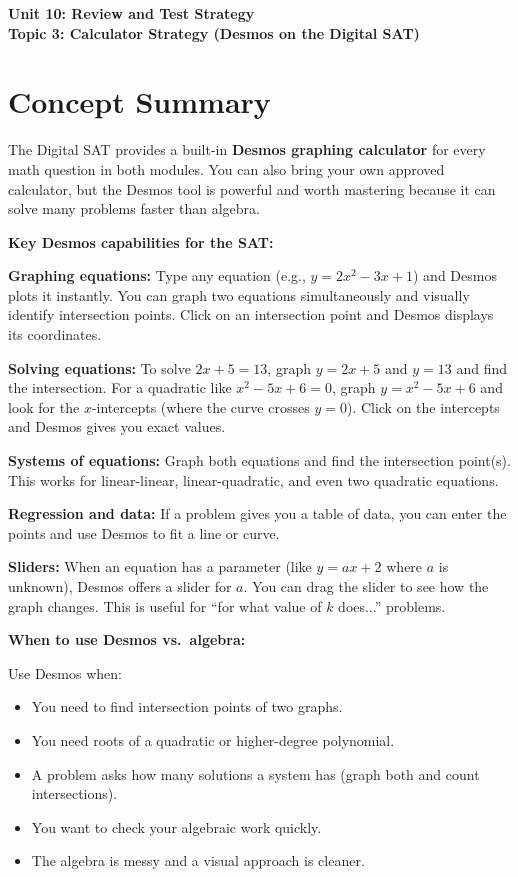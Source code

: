 \documentclass[14pt]{extarticle}
\begin{document}
\raggedright
{}

\begin{center}
    \LARGE \textbf{Unit 10: Review and Test Strategy} \\[6pt]
    \Large \textbf{Topic 3: Calculator Strategy (Desmos on the Digital SAT)}
\end{center}

\vspace{1em}

\section*{Concept Summary}

The Digital SAT provides a built-in \textbf{Desmos graphing calculator} for every math question in both modules. You can also bring your own approved calculator, but the Desmos tool is powerful and worth mastering because it can solve many problems faster than algebra.

\textbf{Key Desmos capabilities for the SAT:}

\textbf{Graphing equations:} Type any equation (e.g., \(y = 2x^2 - 3x + 1\)) and Desmos plots it instantly. You can graph two equations simultaneously and visually identify intersection points. Click on an intersection point and Desmos displays its coordinates.

\textbf{Solving equations:} To solve \(2x + 5 = 13\), graph \(y = 2x + 5\) and \(y = 13\) and find the intersection. For a quadratic like \(x^2 - 5x + 6 = 0\), graph \(y = x^2 - 5x + 6\) and look for the \(x\)-intercepts (where the curve crosses \(y = 0\)). Click on the intercepts and Desmos gives you exact values.

\textbf{Systems of equations:} Graph both equations and find the intersection point(s). This works for linear-linear, linear-quadratic, and even two quadratic equations.

\textbf{Regression and data:} If a problem gives you a table of data, you can enter the points and use Desmos to fit a line or curve.

\textbf{Sliders:} When an equation has a parameter (like \(y = ax + 2\) where \(a\) is unknown), Desmos offers a slider for \(a\). You can drag the slider to see how the graph changes. This is useful for ``for what value of \(k\) does...'' problems.

\textbf{When to use Desmos vs.\ algebra:}

Use Desmos when:
\begin{itemize}
  \item You need to find intersection points of two graphs.
  \item You need roots of a quadratic or higher-degree polynomial.
  \item A problem asks how many solutions a system has (graph both and count intersections).
  \item You want to check your algebraic work quickly.
  \item The algebra is messy and a visual approach is cleaner.
\end{itemize}
\end{document}
